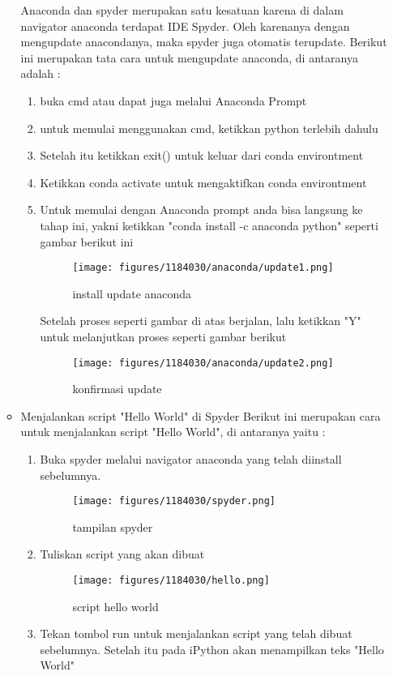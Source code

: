 \begin{enumerate}
\begin{itemize}
		Anaconda dan spyder merupakan satu kesatuan karena di dalam navigator anaconda terdapat IDE Spyder. Oleh karenanya dengan mengupdate anacondanya, maka spyder juga otomatis terupdate. Berikut ini merupakan tata cara untuk mengupdate anaconda, di antaranya adalah :
		\begin{enumerate}
			\item buka cmd atau dapat juga melalui Anaconda Prompt
			\item untuk memulai menggunakan cmd, ketikkan python terlebih dahulu
			\item Setelah itu ketikkan exit() untuk keluar dari conda environtment
			\item Ketikkan conda activate untuk mengaktifkan conda environtment
			\item Untuk memulai dengan Anaconda prompt anda bisa langsung ke tahap ini, yakni ketikkan "conda install -c anaconda python" seperti gambar berikut ini
				\begin{figure}[H]
				\texttt{[image: figures/1184030/anaconda/update1.png]}
				\centering
				\caption{install update anaconda}
				\end{figure}
				Setelah proses seperti gambar di atas berjalan, lalu ketikkan "Y" untuk melanjutkan proses seperti gambar 						berikut
				\begin{figure}[H]
				\texttt{[image: figures/1184030/anaconda/update2.png]}
				\centering
				\caption{konfirmasi update}
				\end{figure}
		\end{enumerate}
	\item Menjalankan script "Hello World" di Spyder
	 Berikut ini merupakan cara untuk menjalankan script "Hello World", di antaranya yaitu :
	 \begin{enumerate}
	 	\item Buka spyder melalui navigator anaconda yang telah diinstall sebelumnya.
	 		\begin{figure}[H]
			\texttt{[image: figures/1184030/spyder.png]}
			\centering
			\caption{tampilan spyder}
			\end{figure}
	 	\item Tuliskan script yang akan dibuat
	 		\begin{figure}[H]
			\texttt{[image: figures/1184030/hello.png]}
			\centering
			\caption{script hello world}
			\end{figure}
	 	\item Tekan tombol run untuk menjalankan script yang telah dibuat sebelumnya. Setelah itu pada iPython akan menampilkan teks "Hello World"

\end{enumerate}
\end{itemize}
\end{enumerate}
